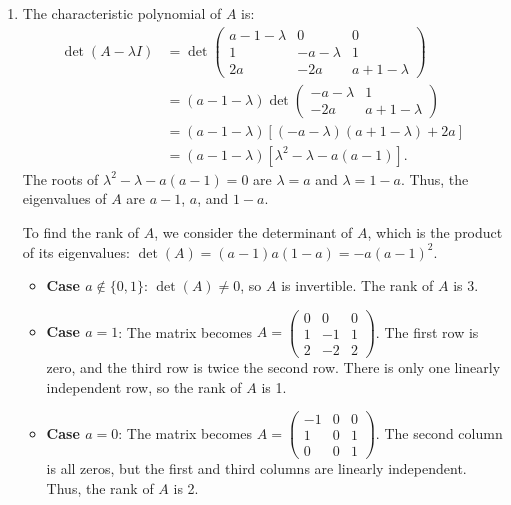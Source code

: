 \documentclass{article}
\begin{document}
\begin{enumerate}[label=\fbox{\arabic*}]
  \item %
        The characteristic polynomial of $A$ is:
        \begin{align*}
          \det(A - \lambda I) &= \det \begin{pmatrix} a-1-\lambda & 0 & 0 \\ 1 & -a-\lambda & 1 \\ 2a & -2a & a+1-\lambda \end{pmatrix} \\
          &= (a-1-\lambda) \det \begin{pmatrix} -a-\lambda & 1 \\ -2a & a+1-\lambda \end{pmatrix} \\
          &= (a-1-\lambda) [(-a-\lambda)(a+1-\lambda) + 2a] \\
          &= (a-1-\lambda) [\lambda^2 - \lambda - a(a-1)].
        \end{align*}
        The roots of $\lambda^2 - \lambda - a(a-1) = 0$ are $\lambda = a$ and $\lambda = 1-a$. 
        Thus, the eigenvalues of $A$ are $a-1$, $a$, and $1-a$.
        
        To find the rank of $A$, we consider the determinant of $A$, which is the product of its eigenvalues: $\det(A) = (a-1)a(1-a) = -a(a-1)^2$.
        \begin{itemize}
          \item \textbf{Case $a \notin \{0, 1\}$}: $\det(A) \neq 0$, so $A$ is invertible. The rank of $A$ is 3.
          \item \textbf{Case $a = 1$}: The matrix becomes
                $A = \begin{pmatrix} 0 & 0 & 0 \\ 1 & -1 & 1 \\ 2 & -2 & 2 \end{pmatrix}$.
                The first row is zero, and the third row is twice the second row. There is only one linearly independent row, so the rank of $A$ is 1.
          \item \textbf{Case $a = 0$}: The matrix becomes
                $A = \begin{pmatrix} -1 & 0 & 0 \\ 1 & 0 & 1 \\ 0 & 0 & 1 \end{pmatrix}$.
                The second column is all zeros, but the first and third columns are linearly independent. Thus, the rank of $A$ is 2.
        \end{itemize}


\end{enumerate}
\end{document}
